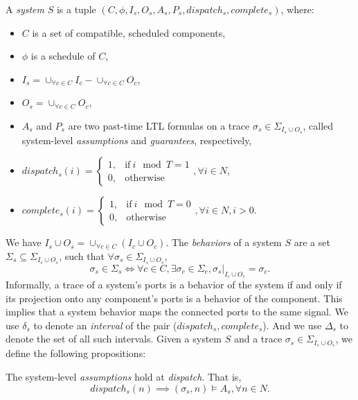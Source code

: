 A \emph{system} $S$ is a tuple $(C, \phi, I_s, O_s, A_s, P_s, dispatch_s, complete_s)$, where:
\begin{itemize}
	\item $C$ is a set of compatible, scheduled components,
	\item $\phi$ is a schedule of $C$,	
	\item $I_s = \cup_{\forall c \in C}I_c -  \cup_{\forall c \in C}O_c$,
	\item $O_s = \cup_{\forall c \in C}O_c$,
	\item $A_s$ and $P_s$ are two past-time LTL formulas on a trace $\sigma_s \in \Sigma_{I_s \cup O_s}$, called system-level \emph{assumptions} and \emph{guarantees}, respectively,
	\item $dispatch_s (i) = 
	    	\begin{cases}
      		1, & \text{if}\ i \mod T =1 \\
	     	0, & \text{otherwise}
   	 	\end{cases}, \forall i \in N$,
   	\item $complete_s (i) =
   		\begin{cases}
      		1, & \text{if}\ i \mod T = 0 \\
	     	0, & \text{otherwise}
   	 	\end{cases}, \forall i \in N, i > 0$.
\end{itemize}
We have $I_s  \cup O_s = \cup_{\forall c \in C}(I_c \cup O_c)$.
The \emph{behaviors} of a system $S$ are a set $\Sigma_s \subseteq \Sigma_{I_s \cup O_s}$, such that $\forall \sigma_s \in \Sigma_{I_s \cup O_s}$, 
\begin{equation}
	\sigma_s\in \Sigma_s  \iff \forall c \in C, \exists \sigma_c \in \Sigma_c, \sigma_s|_{I_c \cup O_c} = \sigma_c.
\end{equation}
Informally, a trace of a system's ports is a behavior of the system if and only if its projection onto any component's ports is a behavior of the component. 
This implies that a system behavior maps the connected ports to the same signal.
We use $\delta_s$ to denote an \emph{interval} of the pair ($dispatch_s, complete_s$). And we use $\Delta_s$ to denote the set of all such intervals.
Given a system $S$ and a trace $\sigma_s \in \Sigma_{I_s \cup O_s}$, we define the following propositions:

\bigskip
The system-level \emph{assumptions} hold at \emph{dispatch}. That is,
\begin{equation} 
\label{eqn:sys_assumption}
	dispatch_s(n) \implies (\sigma_s, n) \models A_s, \forall n\in N.
\end{equation}

